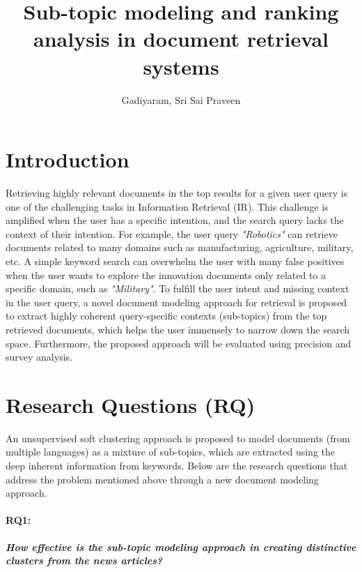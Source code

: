 \documentclass[master,proposal,extern,palatino]{rgseThesis}
\author{Gadiyaram, Sri Sai Praveen}
\title{Sub-topic modeling and ranking analysis in document retrieval systems}
\begin{document}
\setlength{\parindent}{20pt}

\maketitle

\tableofcontents

	\pagebreak

\section{Introduction}


Retrieving highly relevant documents in the top results for a given user query is one of the challenging tasks in Information Retrieval (IR). This challenge is amplified when the user has a specific intention, and the search query lacks the context of their intention. For example, the user query \textit{"Robotics"} can retrieve documents related to many domains such as manufacturing, agriculture, military, etc. A simple keyword search can overwhelm the user with many false positives when the user wants to explore the innovation documents only related to a specific domain, such as \textit{"Military"}. To fulfill the user intent and missing context in the user query, a novel  document modeling approach for retrieval is proposed to extract highly coherent query-specific contexts (sub-topics) from the top retrieved documents, which helps the user immensely to narrow down the search space. Furthermore, the proposed approach will be evaluated using precision and survey analysis.

	\section{Research Questions (RQ)}

An unsupervised soft clustering approach is proposed to model documents (from multiple
languages) as a mixture of sub-topics, which are extracted using the deep inherent information
from keywords. Below are the research questions that address the problem mentioned above through a new document modeling approach.

\paragraph{RQ1:} \textbf{ \textit{How effective is the sub-topic modeling approach in creating distinctive clusters from the news articles?}}
\end{document}
